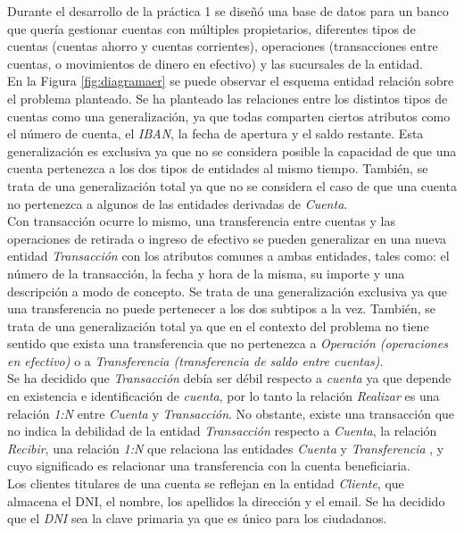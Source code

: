 \documentclass[11pt,a4paper]{article}
\begin{document}
Durante el desarrollo de la práctica 1 se diseñó una base de datos para un banco que quería gestionar cuentas con múltiples propietarios, diferentes tipos de cuentas (cuentas ahorro y cuentas corrientes), operaciones (transacciones entre cuentas, o movimientos de dinero en efectivo) y las sucursales de la entidad.\\
En la Figura \ref{fig:diagramaer} se puede observar el esquema entidad relación sobre el problema planteado. Se ha planteado las relaciones entre los distintos tipos de cuentas como una generalización, ya que todas comparten ciertos atributos como el número de cuenta, el \emph{IBAN}, la fecha de apertura y el saldo restante. Esta generalización es exclusiva ya que no se considera posible la capacidad de que una cuenta pertenezca a los dos tipos de entidades al mismo tiempo. También, se trata de una generalización total ya que no se considera el caso de que una cuenta no pertenezca a algunos de las entidades derivadas de \emph{Cuenta}.\\
Con transacción ocurre lo mismo, una transferencia entre cuentas y las operaciones de retirada o ingreso de efectivo se pueden generalizar en una nueva entidad \emph{Transacción} con los atributos comunes a ambas entidades, tales como: el número de la transacción, la fecha y hora de la misma, su importe y una descripción a modo de concepto. Se trata de una generalización exclusiva ya que una transferencia no puede pertenecer a los dos subtipos a la vez. También, se trata de una generalización total ya que en el contexto del problema no tiene sentido que exista una transferencia que no pertenezca a \emph{Operación (operaciones en efectivo)} o a \emph{Transferencia (transferencia de saldo entre cuentas)}.\\
Se ha decidido que \emph{Transacción} debía ser débil respecto a \emph{cuenta} ya que depende en existencia e identificación de \emph{cuenta}, por lo tanto la relación \emph{Realizar} es una relación \emph{1:N} entre \emph{Cuenta} y \emph{Transacción}. No obstante, existe una transacción que no indica la debilidad de la entidad \emph{Transacción} respecto a \emph{Cuenta}, la relación \emph{Recibir}, una relación \emph{1:N} que relaciona las entidades \emph{Cuenta} y \emph{Transferencia} , y cuyo significado es relacionar una transferencia con la cuenta beneficiaria.\\
Los clientes titulares de una cuenta se reflejan en la entidad \emph{Cliente}, que almacena el DNI, el nombre, los apellidos la dirección y el email. Se ha decidido que el \emph{DNI} sea la clave primaria ya que es único para los ciudadanos.\\
\end{document}
